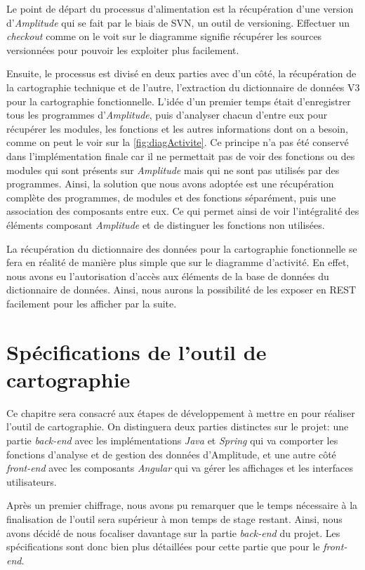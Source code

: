 \documentclass{polytech/polytech}
\begin{document}
Le point de départ du processus d'alimentation est la récupération d'une version d'\textit{Amplitude} qui se fait par le biais de SVN, un outil de versioning. Effectuer un \textit{checkout} comme on le voit sur le diagramme signifie récupérer les sources versionnées pour pouvoir les exploiter plus facilement.

Ensuite, le processus est divisé en deux parties avec d'un côté, la récupération de la cartographie technique et de l'autre, l'extraction du dictionnaire de données V3 pour la cartographie fonctionnelle. L'idée d'un premier temps était d'enregistrer tous les programmes d'\textit{Amplitude}, puis d'analyser chacun d'entre eux pour récupérer les modules, les fonctions et les autres informations dont on a besoin, comme on peut le voir sur la \autoref{fig:diagActivite}. Ce principe n'a pas été conservé dans l'implémentation finale car il ne permettait pas de voir des fonctions ou des modules qui sont présents sur \textit{Amplitude} mais qui ne sont pas utilisés par des programmes. Ainsi, la solution que nous avons adoptée est une récupération complète des programmes, de modules et des fonctions séparément, puis une association des composants entre eux. Ce qui permet ainsi de voir l'intégralité des éléments composant \textit{Amplitude} et de distinguer les fonctions non utilisées. 

La récupération du dictionnaire des données pour la cartographie fonctionnelle se fera en réalité de manière plus simple que sur le diagramme d'activité. En effet, nous avons eu l'autorisation d'accès aux éléments de la base de données du dictionnaire de données. Ainsi, nous aurons la possibilité de les exposer en REST facilement pour les afficher par la suite. 

\chapter{Spécifications de l'outil de cartographie}

Ce chapitre sera consacré aux étapes de développement à mettre en pour réaliser l’outil de cartographie. On distinguera deux parties distinctes sur le projet: une partie \textit{back-end} avec les implémentations \textit{Java} et \textit{Spring} qui va comporter les fonctions d’analyse et de gestion des données d’Amplitude, et une autre côté \textit{front-end} avec les composants \textit{Angular} qui va gérer les affichages et les interfaces utilisateurs.

Après un premier chiffrage, nous avons pu remarquer que le temps nécessaire à la finalisation de l'outil sera supérieur à mon temps de stage restant. Ainsi, nous avons décidé de nous focaliser davantage sur la partie \textit{back-end} du projet. Les spécifications sont donc bien plus détaillées pour cette partie que pour le \textit{front-end}.
\end{document}
